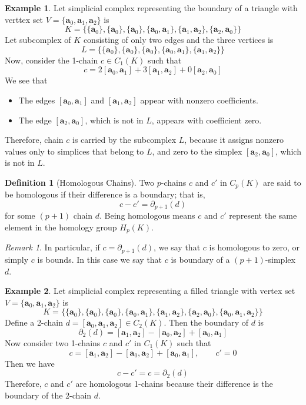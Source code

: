 \documentclass[12pt,oneside,reqno]{amsart}
\theoremstyle{plain}
\theoremstyle{definition}
\newtheorem{example}{Example}[section]
\newtheorem{definition}[theorem]{Definition}
\theoremstyle{remark}
\newtheorem{remark}[theorem]{Remark}
\newcommand{\0}{{\textbf{0}}}
\begin{document}
\begin{example}
Let simplicial complex representing the boundary of a triangle with verttex set $V = \{\bm{a}_0, \bm{a}_1, \bm{a}_2\}$ is 
\[K = \{\{\bm{a}_0\}, \{\bm{a}_0\}, \{\bm{a}_0\}, \{\bm{a}_0, \bm{a}_1\}, \{\bm{a}_1, \bm{a}_2\}, \{\bm{a}_2, \bm{a}_0\}\}\]
Let subcomplex of $K$ consisting of only two edges and the three vertices is 
\[L = \{\{\bm{a}_0\}, \{\bm{a}_0\}, \{\bm{a}_0\}, \{\bm{a}_0, \bm{a}_1\}, \{\bm{a}_1, \bm{a}_2\}\}\]
Now, consider the 1-chain $c \in C_{1}(K)$ such that
\[
c = 2[\bm{a}_0, \bm{a}_1] + 3[\bm{a}_1, \bm{a}_2] + 0[\bm{a}_2, \bm{a}_0]
\]
We see that
\begin{itemize}
\item The edges $[\bm{a}_0, \bm{a}_1]$ and $[\bm{a}_1, \bm{a}_2]$ appear with nonzero coefficients.
\item The edge $[\bm{a}_2, \bm{a}_0]$, which is not in $L$, appears with coefficient zero.
\end{itemize}
Therefore, chain $c$ is carried by the subcomplex $L$, because it assigns nonzero values only to simplices that belong to $L$, and zero to the simplex $[\bm{a}_2, \bm{a}_0]$, which is not in $L$.
\end{example}

\begin{definition}[Homologous Chains]\label{d:Homologous Chains}
Two $p$-chains $c$ and $c'$ in $C_{p}(K)$ are said to be homologous if their difference is a boundary; that is, 
\[c - c' = \partial_{p + 1}(d)\]
for some $(p + 1)$ chain $d$. Being homologous means $c$ and $c'$ represent the same element in the homology group $H_p(K)$.   
\end{definition}

\begin{remark}
In particular, if $c = \partial_{p + 1}(d)$, we say that $c$ is homologous to zero, or simply $c$ is bounds. In this case we say that $c$ is boundary of a $(p + 1)$-simplex $d$.
\end{remark}

\begin{example}
Let simplicial complex representing a filled triangle with vertex set $V = \{\bm{a}_0, \bm{a}_1, \bm{a}_2\}$ is 
\[K = \{\{\bm{a}_0\}, \{\bm{a}_0\}, \{\bm{a}_0\}, \{\bm{a}_0, \bm{a}_1\}, \{\bm{a}_1, \bm{a}_2\}, \{\bm{a}_2, \bm{a}_0\}, \{\bm{a}_0, \bm{a}_1, \bm{a}_2\}\} \]
Define a 2-chain $d = [\bm{a}_0, \bm{a}_1, \bm{a}_2] \in C_2(K)$. Then the boundary of $d$ is
\[\partial_2(d) = [\bm{a}_1, \bm{a}_2] - [\bm{a}_0, \bm{a}_2] + [\bm{a}_0, \bm{a}_1]\]
Now consider two 1-chains $c$ and $c'$ in $C_{1}(K)$ such that 
\[c = [\bm{a}_1, \bm{a}_2] - [\bm{a}_0, \bm{a}_2] + [\bm{a}_0, \bm{a}_1], \qquad c' = 0\]
Then we have
\[c - c' = c = \partial_2(d)\]
Therefore, $c$ and $c'$ are homologous 1-chains because their difference is the boundary of the 2-chain $d$.
\end{example}
\end{document}
